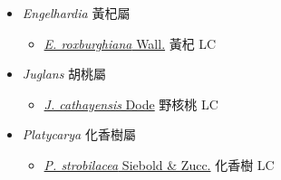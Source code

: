 
  \begin{itemize}
 \item[] \textit{Engelhardia} 黃杞屬
                                
  \begin{itemize}
        \item[] \href{http://www.theplantlist.org/tpl1.1/search?q=Engelhardia+roxburghiana}{\textit{E. roxburghiana} Wall.}   黃杞   LC
  \end{itemize}
 \item[] \textit{Juglans} 胡桃屬
                                
  \begin{itemize}
        \item[] \href{http://www.theplantlist.org/tpl1.1/search?q=Juglans+cathayensis}{\textit{J. cathayensis} Dode}   野核桃   LC
  \end{itemize}
 \item[] \textit{Platycarya} 化香樹屬
                                
  \begin{itemize}
        \item[] \href{http://www.theplantlist.org/tpl1.1/search?q=Platycarya+strobilacea}{\textit{P. strobilacea} Siebold \& Zucc.}   化香樹   LC
  \end{itemize}
  \end{itemize}
